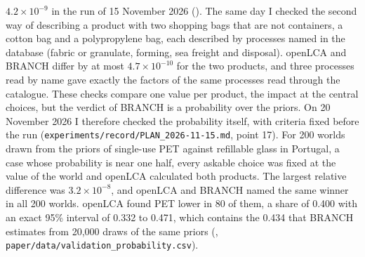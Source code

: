 \documentclass{article}
\begin{document}
$4.2\times10^{-9}$ in the run of 15 November 2026 (). The same day I checked the second way of describing
a product with two shopping bags that are not containers, a cotton bag and a polypropylene bag, each described by
processes named in the database (fabric or granulate, forming, sea freight and disposal). openLCA and BRANCH
differ by at most $4.7\times10^{-10}$ for the two products, and three processes read by name gave exactly the factors
of the same processes read through the catalogue.
These checks compare one value per product, the impact at the central choices, but the verdict of BRANCH
is a probability over the priors. On 20 November 2026 I therefore checked the probability itself, with
criteria fixed before the run (\texttt{experiments/record/PLAN\_2026-11-15.md}, point 17). For 200 worlds drawn from the
priors of single-use PET against refillable glass in Portugal, a case whose probability is near one half, every
askable choice was fixed at the value of the world and openLCA calculated both products. The largest relative
difference was $3.2\times10^{-8}$, and openLCA and BRANCH named the same winner in all 200 worlds. openLCA found PET
lower in 80 of them, a share of 0.400 with an exact 95\% interval of 0.332 to 0.471, which contains the 0.434 that
BRANCH estimates from 20,000 draws of the same priors (,
\texttt{paper/data/validation\_probability.csv}).
\end{document}
